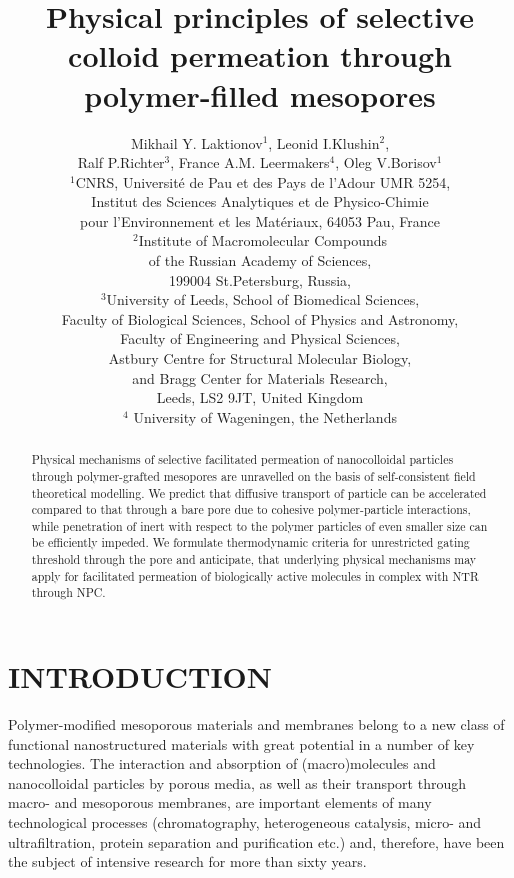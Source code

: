 \documentclass[12pt, a4paper]{article}
\title{Physical principles of selective colloid permeation through polymer-filled mesopores}
\author{Mikhail Y. Laktionov$^1$, Leonid I.Klushin$^{2}$,\\Ralf P.Richter$^3$, France A.M. Leermakers$^4$, Oleg V.Borisov$^1$\\
$^{1}$CNRS, Universit\'e de Pau et des Pays de l'Adour UMR 5254,\\
Institut des Sciences Analytiques et de Physico-Chimie\\
pour l'Environnement et les Mat\'eriaux, 64053 Pau, France \\
$^{2}$Institute of Macromolecular Compounds \\
of the Russian Academy of Sciences, \\
199004 St.Petersburg, Russia,\\
$^{3}$University of Leeds, School of Biomedical Sciences, \\
Faculty of Biological Sciences, 
School of Physics and Astronomy, \\
Faculty of Engineering and Physical Sciences,\\  
Astbury Centre for Structural Molecular Biology,\\ 
and Bragg Center for Materials Research,\\ 
Leeds, LS2 9JT, United Kingdom\\
$^{4}$ University of Wageningen, the Netherlands
}
\date{}
\begin{document}
\maketitle

\begin{abstract}


Physical mechanisms of selective facilitated permeation of nanocolloidal particles 
through polymer-grafted mesopores are unravelled on the basis of self-consistent field theoretical modelling.
We predict that diffusive transport of particle can be accelerated compared to that through a bare pore due to
cohesive polymer-particle interactions, while penetration of inert with respect to the polymer particles of even smaller size can be 
efficiently impeded. We formulate thermodynamic criteria for unrestricted gating threshold through the pore and anticipate, that underlying
physical mechanisms may apply for facilitated permeation of biologically active molecules in complex with NTR through NPC.   
\end{abstract}

\section{INTRODUCTION}


Polymer-modified mesoporous materials and membranes belong to a new class of functional nanostructured materials with great potential in a number of key technologies. 
The interaction and absorption of (macro)molecules and nanocolloidal particles by porous media, as well as their transport through macro- and mesoporous membranes, are important elements of many technological processes (chromatography, heterogeneous catalysis, micro- and ultrafiltration, protein separation and purification etc.) and, therefore, have been the subject of intensive research for more than sixty years.\cite{Watson1959, Rout2003, Huang2023, Uredat2024}
\end{document}
